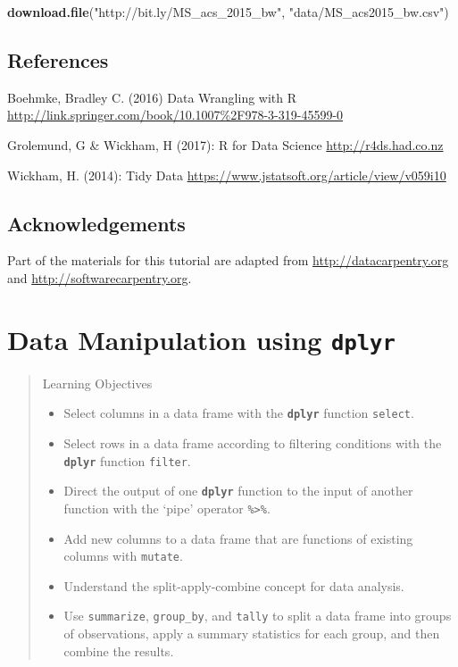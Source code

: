 \documentclass[]{book}
\newenvironment{Shaded}{\begin{snugshade}}{\end{snugshade}}
\newcommand{\KeywordTok}[1]{\textcolor[rgb]{0.13,0.29,0.53}{\textbf{#1}}}
\newcommand{\NormalTok}[1]{#1}
\newcommand{\StringTok}[1]{\textcolor[rgb]{0.31,0.60,0.02}{#1}}
\providecommand{\tightlist}{%
  \setlength{\itemsep}{0pt}\setlength{\parskip}{0pt}}
\begin{document}
\begin{Shaded}
\begin{Highlighting}[]
\KeywordTok{download.file}\NormalTok{(}\StringTok{"http://bit.ly/MS_acs_2015_bw"}\NormalTok{,}
              \StringTok{"data/MS_acs2015_bw.csv"}\NormalTok{)}
\end{Highlighting}
\end{Shaded}

\hypertarget{references}{%
\section*{References}\label{references}}

Boehmke, Bradley C. (2016) Data Wrangling with R
\url{http://link.springer.com/book/10.1007\%2F978-3-319-45599-0}

Grolemund, G \& Wickham, H (2017): R for Data Science \url{http://r4ds.had.co.nz}

Wickham, H. (2014): Tidy Data \url{https://www.jstatsoft.org/article/view/v059i10}

\hypertarget{acknowledgements}{%
\section*{Acknowledgements}\label{acknowledgements}}

Part of the materials for this tutorial are adapted from \url{http://datacarpentry.org} and \url{http://softwarecarpentry.org}.

\hypertarget{dplyr}{%
\chapter{\texorpdfstring{Data Manipulation using \textbf{\texttt{dplyr}}}{Data Manipulation using dplyr}}\label{dplyr}}

\begin{quote}
Learning Objectives

\begin{itemize}
\tightlist
\item
  Select columns in a data frame with the \textbf{\texttt{dplyr}} function \texttt{select}.
\item
  Select rows in a data frame according to filtering conditions with the \textbf{\texttt{dplyr}} function \texttt{filter}.
\item
  Direct the output of one \textbf{\texttt{dplyr}} function to the input of another function with the `pipe' operator \texttt{\%\textgreater{}\%}.
\item
  Add new columns to a data frame that are functions of existing columns with \texttt{mutate}.
\item
  Understand the split-apply-combine concept for data analysis.
\item
  Use \texttt{summarize}, \texttt{group\_by}, and \texttt{tally} to split a data frame into groups of observations, apply a summary statistics for each group, and then combine the results.
\end{itemize}
\end{quote}
\end{document}
